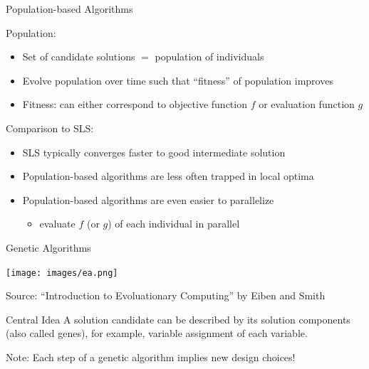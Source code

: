 \begin{frame}[c]{Population-based Algorithms}

\begin{block}{Population:}
\begin{itemize}
  \item Set of candidate solutions $=$ population of individuals
  \item Evolve population over time such that ``fitness'' of population improves
  \item Fitness: can either correspond to objective function $f$ or evaluation function $g$
\end{itemize}
\end{block}

\pause

\begin{block}{Comparison to SLS:}
\begin{itemize}
  \item SLS typically converges faster to good intermediate solution
  \item Population-based algorithms are less often trapped in local optima
  \item Population-based algorithms are even easier to parallelize
  \begin{itemize}
    \item evaluate $f$ (or $g$) of each individual in parallel
  \end{itemize}
\end{itemize}
\end{block}

\end{frame}
\begin{frame}[c]{Genetic Algorithms}

\begin{center} 
	\texttt{[image: images/ea.png]}  
\end{center}
{\tiny Source: ``Introduction to Evoluationary Computing'' by Eiben and Smith }

\bigskip
\pause

\begin{block}{Central Idea}
A solution candidate can be described by its solution components\\ (also called genes),
for example, variable assignment of each variable.
\end{block}

\bigskip
\pause
Note: Each step of a genetic algorithm implies new design choices!

\end{frame}
